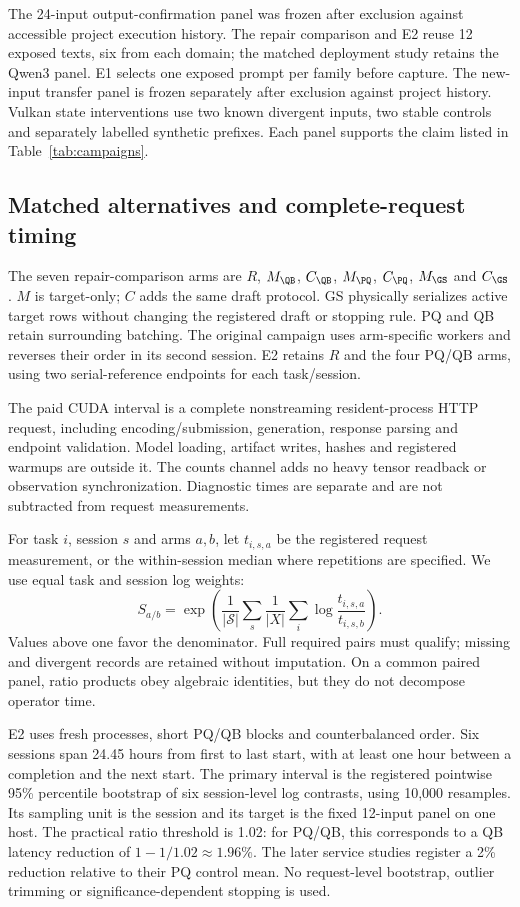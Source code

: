 The 24-input output-confirmation panel was frozen after exclusion against accessible project execution history. The repair comparison and E2 reuse 12 exposed texts, six from each domain; the matched deployment study retains the Qwen3 panel. E1 selects one exposed prompt per family before capture. The new-input transfer panel is frozen separately after exclusion against project history. Vulkan state interventions use two known divergent inputs, two stable controls and separately labelled synthetic prefixes. Each panel supports the claim listed in Table~\ref{tab:campaigns}.

\subsection{Matched alternatives and complete-request timing}
The seven repair-comparison arms are $R$, $M_{\QB}$, $C_{\QB}$, $M_{\PQ}$, $C_{\PQ}$, $M_{\GS}$ and $C_{\GS}$. $M$ is target-only; $C$ adds the same draft protocol. GS physically serializes active target rows without changing the registered draft or stopping rule. PQ and QB retain surrounding batching. The original campaign uses arm-specific workers and reverses their order in its second session. E2 retains $R$ and the four PQ/QB arms, using two serial-reference endpoints for each task/session.

The paid CUDA interval is a complete nonstreaming resident-process HTTP request, including encoding/submission, generation, response parsing and endpoint validation. Model loading, artifact writes, hashes and registered warmups are outside it. The counts channel adds no heavy tensor readback or observation synchronization. Diagnostic times are separate and are not subtracted from request measurements.

For task $i$, session $s$ and arms $a,b$, let $t_{i,s,a}$ be the registered request measurement, or the within-session median where repetitions are specified. We use equal task and session log weights:
\begin{equation}
S_{a/b}=\exp\!\left(\frac{1}{|\mathcal S|}\sum_s\frac{1}{|X|}\sum_i\log\frac{t_{i,s,a}}{t_{i,s,b}}\right).
\label{eq:ratio}
\end{equation}
Values above one favor the denominator. Full required pairs must qualify; missing and divergent records are retained without imputation. On a common paired panel, ratio products obey algebraic identities, but they do not decompose operator time.

E2 uses fresh processes, short PQ/QB blocks and counterbalanced order. Six sessions span 24.45 hours from first to last start, with at least one hour between a completion and the next start. The primary interval is the registered pointwise 95\% percentile bootstrap of six session-level log contrasts, using 10,000 resamples. Its sampling unit is the session and its target is the fixed 12-input panel on one host. The practical ratio threshold is 1.02: for PQ/QB, this corresponds to a QB latency reduction of $1-1/1.02\approx1.96\%$. The later service studies register a 2\% reduction relative to their PQ control mean. No request-level bootstrap, outlier trimming or significance-dependent stopping is used.

